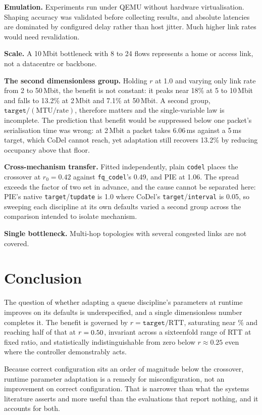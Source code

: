 \documentclass[11pt,a4paper]{article}
\begin{document}
\textbf{Emulation.} Experiments run under QEMU without hardware
virtualisation. Shaping accuracy was validated before collecting results, and
absolute latencies are dominated by configured delay rather than host jitter.
Much higher link rates would need revalidation.

\textbf{Scale.} A 10\,Mbit bottleneck with 8 to 24 flows represents a home or
access link, not a datacentre or backbone.

\textbf{The second dimensionless group.} Holding $r$ at 1.0 and varying only
link rate from 2 to 50\,Mbit, the benefit is not constant: it peaks near 18\%
at 5 to 10\,Mbit and falls to 13.2\% at 2\,Mbit and 7.1\% at 50\,Mbit. A
second group, $\texttt{target}/(\mathrm{MTU}/\mathrm{rate})$, therefore
matters and the single-variable law is incomplete. The prediction that benefit
would be suppressed below one packet's serialisation time was wrong: at
2\,Mbit a packet takes 6.06\,ms against a 5\,ms target, which CoDel cannot
reach, yet adaptation still recovers 13.2\% by reducing occupancy above that
floor.

\textbf{Cross-mechanism transfer.} Fitted independently, plain \texttt{codel}
places the crossover at $r_0=0.42$ against \texttt{fq\_codel}'s 0.49, and PIE
at 1.06. The spread exceeds the factor of two set in advance, and the cause
cannot be separated here: PIE's native \texttt{target}/\texttt{tupdate} is 1.0
where CoDel's \texttt{target}/\texttt{interval} is 0.05, so sweeping each
discipline at its own defaults varied a second group across the comparison
intended to isolate mechanism.

\textbf{Single bottleneck.} Multi-hop topologies with several congested links
are not covered.

\section{Conclusion}

The question of whether adapting a queue discipline's parameters at runtime
improves on its defaults is underspecified, and a single dimensionless number
completes it. The benefit is governed by $r=\texttt{target}/\mathrm{RTT}$,
saturating near \LawCeiling\% and reaching half of that at
$r=0.50$, invariant across a sixteenfold range of RTT at fixed
ratio, and statistically indistinguishable from zero below $r\approx0.25$ even
where the controller demonstrably acts.

Because correct configuration sits an order of magnitude below the crossover,
runtime parameter adaptation is a remedy for misconfiguration, not an
improvement on correct configuration. That is narrower than what the systems
literature asserts and more useful than the evaluations that report nothing,
and it accounts for both.
\end{document}
